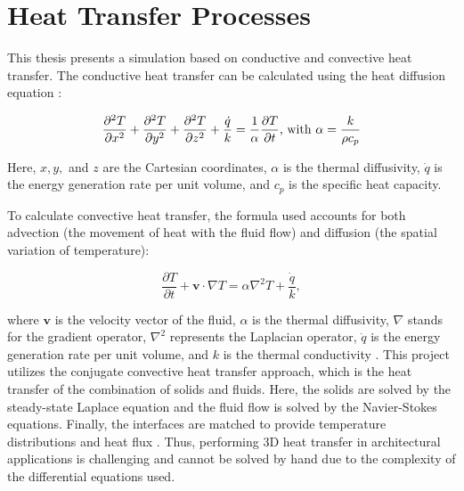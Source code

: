 \section{Heat Transfer Processes}


This thesis presents a simulation based on conductive and convective heat transfer. 
The conductive heat transfer can be calculated using the heat diffusion equation \cite{bergman2011fundamentals}:
	
	\begin{equation} 
	\frac{\partial^2 T}{\partial x^2}+
	\frac{\partial^2 T}{\partial y^2}+
	\frac{\partial^2 T}{\partial z^2}+ 
	\frac{\dot{q}}{k}= \frac{1}{\alpha}\frac{\partial T}{\partial t} \text{, with } \alpha = \frac{k}{\rho c_p}\quad \\
	\end{equation}
	
	
Here, $x,y,$ and $z$ are the Cartesian coordinates, $\alpha$ is the thermal diffusivity, $\dot{q}$ is the energy generation rate per unit volume, and $c_p$ is the specific heat capacity.
 
To calculate convective heat transfer, the formula used accounts for both advection (the movement of heat with the fluid flow) and diffusion (the spatial variation of temperature): 

\begin{equation}
    \frac{\partial T}{\partial t} + \mathbf{v} \cdot \nabla T = \alpha \nabla^2 T + \frac{\dot{q}}{k},
\end{equation}

where $\mathbf{v}$ is the velocity vector of the fluid, $\alpha$ is the thermal diffusivity, $\nabla$ stands for the gradient operator, $\nabla^2$ represents the Laplacian operator, $\dot{q}$ is the energy generation rate per unit volume, and $k$ is the thermal conductivity \cite{bergman2011fundamentals}. This project utilizes the conjugate convective heat transfer approach, which is the heat transfer of the combination of solids and fluids. Here, the solids are solved by the steady-state Laplace equation and the fluid flow is solved by the Navier-Stokes equations. Finally, the interfaces are matched to provide temperature distributions and heat flux \cite{Zhao2007}. Thus, performing 3D heat transfer in architectural applications is challenging and cannot be solved by hand due to the complexity of the differential equations used.



